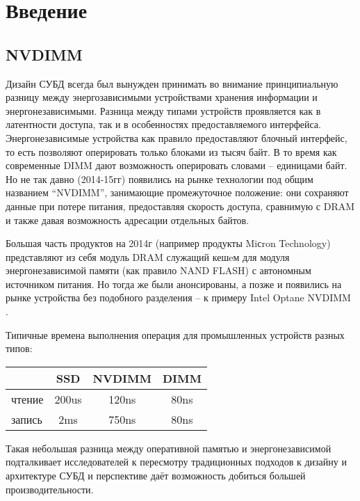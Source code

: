 \documentclass[pdftex,ptm,12pt,a4paper]{report}
\theoremstyle{definition}
\begin{document}
\tableofcontents
\sloppy

\parindent=1.25cm

\chapter{Введение}
\section{NVDIMM}
Дизайн СУБД всегда был вынужден принимать во внимание принципиальную разницу между энергозависимыми устройствами хранения информации и энергонезависимыми.
Разница между типами устройств проявляется как в латентности доступа, так и в особенностях предоставляемого интерфейса.
Энергонезависимые устройства как правило предоставляют блочный интерфейс, то есть
позволяют оперировать только блоками из тысяч байт. В то время как современные DIMM дают возможность оперировать словами -- единицами байт.
Но не так давно (2014-15гг) появились на рынке технологии под общим названием “NVDIMM”, занимающие промежуточное положение: они сохраняют данные при потере питания,
предоставляя скорость доступа, сравнимую с DRAM и также давая возможность адресации отдельных байтов.

Большая часть продуктов на 2014г (например продукты Miсron Technology) представляют из себя модуль DRAM служащий кешeм для модуля энергонезависимой памяти (как правило NAND FLASH)
с автономным источником питания. Но тогда же были анонсированы, а позже и появились на рынке устройства без подобного разделения -- к примеру Intel Optane NVDIMM \cite{peng2019system}.

Типичные времена выполнения операция для промышленных устройств разных типов:
\begin{center}
\begin{tabular} {|l| c c c|}
\hline
    & SSD & NVDIMM & DIMM \\
    \hline
чтение & 200us & 120ns & 80ns \\
запись & 2ms & 750ns & 80ns \\
\hline
\end{tabular}
\end{center}

Такая небольшая разница между оперативной памятью и энергонезависимой подталкивает исследователей к пересмотру традиционных подходов к дизайну и архитектуре СУБД и перспективе даёт возможность добиться большей производительности.
\end{document}
